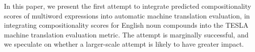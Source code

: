 In this paper, we present the first attempt to integrate predicted compositionality scores of multiword expressions into automatic machine translation evaluation, in integrating compositionality scores for English noun compounds into the TESLA machine translation evaluation metric. The attempt is marginally successful, and we speculate on whether a larger-scale attempt is likely to have greater impact.
